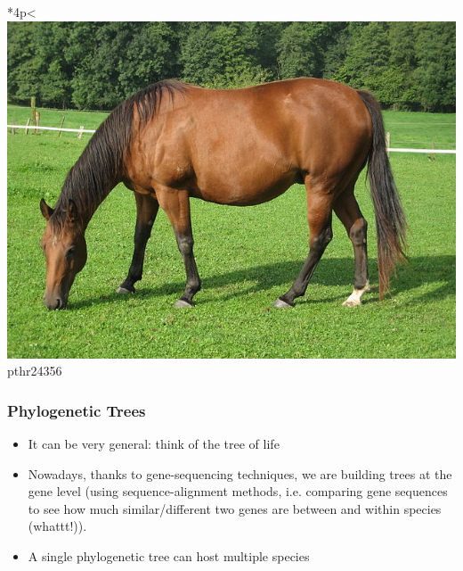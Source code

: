 \documentclass[aspectratio=169, 10pt]{beamer}\usepackage[]{graphicx}\usepackage[]{color}
\begin{document}
\begin{frame}
\begin{table}
\begin{tabular}{*{4}{p{\tmpwidth}<\centering}}
\includegraphics[width=1\linewidth]{horse.jpg} \linebreak pthr24356
\end{tabular}
\end{table}


\end{frame}

\begin{frame}
\frametitle{Phylogenetic Trees}
\pause
\begin{itemize}[<+->]
\item It can be very general: think of the tree of life
\item Nowadays, thanks to gene-sequencing techniques, we are building trees at the
gene level (using sequence-alignment methods, i.e. comparing gene sequences to see how much similar/different two genes are between and within species (whattt!)).
\item A single phylogenetic tree can host multiple species
\end{itemize}

\end{frame}
\end{document}

